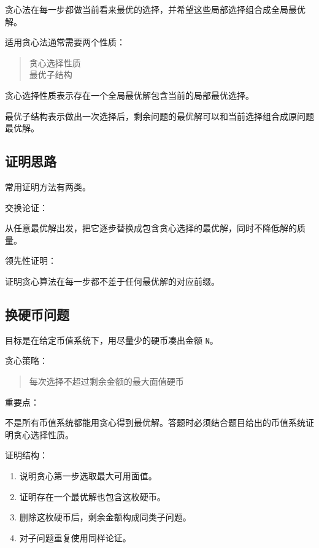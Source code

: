 \documentclass[UTF8,zihao=-4]{ctexart}
\begin{document}
贪心法在每一步都做当前看来最优的选择，并希望这些局部选择组合成全局最优解。

适用贪心法通常需要两个性质：

\begin{quote}
\small\ttfamily\raggedright
\relax 贪心选择性质\\
\relax 最优子结构\\
\end{quote}

贪心选择性质表示存在一个全局最优解包含当前的局部最优选择。

最优子结构表示做出一次选择后，剩余问题的最优解可以和当前选择组合成原问题最优解。

\subsection*{证明思路}

常用证明方法有两类。

交换论证：

从任意最优解出发，把它逐步替换成包含贪心选择的最优解，同时不降低解的质量。

领先性证明：

证明贪心算法在每一步都不差于任何最优解的对应前缀。

\subsection*{换硬币问题}

目标是在给定币值系统下，用尽量少的硬币凑出金额 \texttt{N}。

贪心策略：

\begin{quote}
\small\ttfamily\raggedright
\relax 每次选择不超过剩余金额的最大面值硬币\\
\end{quote}

重要点：

不是所有币值系统都能用贪心得到最优解。答题时必须结合题目给出的币值系统证明贪心选择性质。

证明结构：

\begin{enumerate}
\item 说明贪心第一步选取最大可用面值。
\item 证明存在一个最优解也包含这枚硬币。
\item 删除这枚硬币后，剩余金额构成同类子问题。
\item 对子问题重复使用同样论证。
\end{enumerate}
\end{document}
